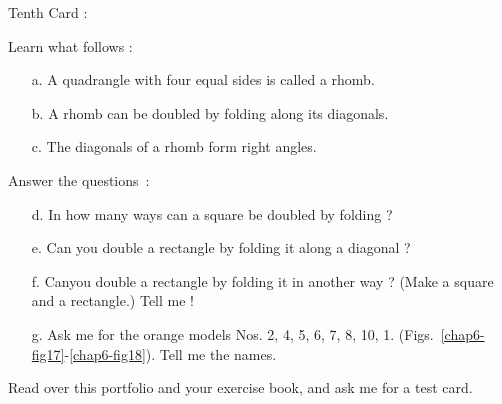 Tenth Card :

Learn what follows :
\begin{itemize}
\item[a.] A quadrangle with four equal sides is called a rhomb.

\item[b.] A rhomb can be doubled by folding along its diagonals.

\item[c.] The diagonals of a rhomb form right angles.
\end{itemize}

Answer the questions~:
\begin{itemize}
\item[d.] In how many ways can a square be doubled by folding ?

\item[e.] Can you double a rectangle by folding it along a diagonal ?

\item[f.] Can\pageoriginale you double a rectangle by folding it in another way ? (Make a square and a rectangle.) Tell me !

\item[g.] Ask me for the orange models Nos. 2, 4, 5, 6, 7, 8, 10, 1. (Figs.~\ref{chap6-fig17}-\ref{chap6-fig18}). Tell me the names.
\end{itemize}

Read over this portfolio and your exercise book, and ask me for a test card.

